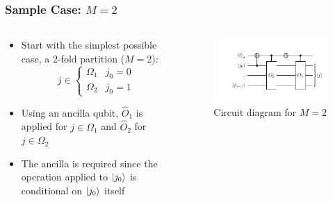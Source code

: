 \documentclass{beamer}
\begin{document}
\begin{frame}
\frametitle{Sample Case: $M=2$}
\begin{columns}
\begin{column}{0.4\textwidth}
\begin{itemize}
\item Start with the simplest possible case, a 2-fold partition ($M=2$): 
\begin{equation}
j \in \begin{cases}
\Omega_1 & j_0 = 0 \\
\Omega_2 & j_0 = 1
\end{cases}
\end{equation}
\item Using an ancilla qubit, $\hat{O}_1$ is applied for $j \in \Omega_1$ and $\hat{O}_2$ for $j \in \Omega_2$
\item The ancilla is required since the operation applied to $\ket{j_0}$ is conditional on $\ket{j_0}$ itself 
\end{itemize}
\end{column}
\begin{column}{0.6\textwidth}
\begin{figure}
\centering 
\includegraphics[width=\textwidth]{im/circuit_2-fold}
\caption{Circuit diagram for $M=2$}
\end{figure}
\end{column}
\end{columns}
\end{frame}
\end{document}
